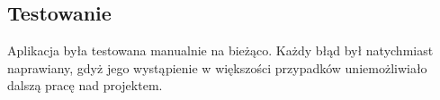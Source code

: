 \documentclass[12pt,a4paper]{article}
\begin{document}
\subsection{Testowanie}
Aplikacja była testowana manualnie na bieżąco. Każdy błąd był natychmiast naprawiany, gdyż jego wystąpienie w większości przypadków uniemożliwiało dalszą pracę nad projektem.
\end{document}
